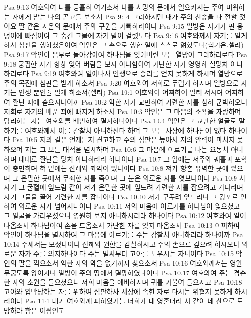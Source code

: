 Psa 9:13  여호와여 나를 긍휼히 여기소서 나를 사망의 문에서 일으키시는 주여 미워하는 자에게 받는 나의 곤고를 보소서
Psa 9:14  그리하시면 내가 주의 찬송을 다 전할 것이요 딸 같은 시온의 문에서 주의 구원을 기뻐하리이다
Psa 9:15  열방은 자기가 판 웅덩이에 빠짐이여 그 숨긴 그물에 자기 발이 걸렸도다
Psa 9:16  여호와께서 자기를 알게 하사 심판을 행하셨음이여 악인은 그 손으로 행한 일에 스스로 얽혔도다(힉가욘.셀라)
Psa 9:17  악인이 음부로 돌아감이여 하나님을 잊어버린 모든 열방이 그리하리로다
Psa 9:18  궁핍한 자가 항상 잊어 버림을 보지 아니함이여 가난한 자가 영영히 실망치 아니하리로다
Psa 9:19  여호와여 일어나사 인생으로 승리를 얻지 못하게 하시며 열방으로 주의 목전에 심판을 받게 하소서
Psa 9:20  여호와여 저희로 두렵게 하시며 열방으로 자기는 인생 뿐인줄 알게 하소서(셀라)
Psa 10:1  여호와여 어찌하여 멀리 서시며 어찌하여 환난 때에 숨으시나이까
Psa 10:2  악한 자가 교만하여 가련한 자를 심히 군박하오니 저희로 자기의 베푼 꾀에 빠지게 하소서
Psa 10:3  악인은 그 마음의 소욕을 자랑하며 탐리하는 자는 여호와를 배반하여 멸시하나이다
Psa 10:4  악인은 그 교만한 얼굴로 말하기를 여호와께서 이를 감찰치 아니하신다 하며 그 모든 사상에 하나님이 없다 하나이다
Psa 10:5  저의 길은 언제든지 견고하고 주의 심판은 높아서 저의 안력이 미치지 못하오며 저는 그 모든 대적을 멸시하며
Psa 10:6  그 마음에 이르기를 나는 요동치 아니하며 대대로 환난을 당치 아니하리라 하나이다
Psa 10:7  그 입에는 저주와 궤휼과 포학이 충만하며 혀 밑에는 잔해와 죄악이 있나이다
Psa 10:8  저가 향촌 유벽한 곳에 앉으며 그 은밀한 곳에서 무죄한 자를 죽이며 그 눈은 외로운 자를 엿보나이다
Psa 10:9  사자가 그 굴혈에 엎드림 같이 저가 은밀한 곳에 엎드려 가련한 자를 잡으려고 기다리며 자기 그물을 끌어 가련한 자를 잡나이다
Psa 10:10  저가 구푸려 엎드리니 그 강포로 인하여 외로운 자가 넘어지나이다
Psa 10:11  저의 마음에 이르기를 하나님이 잊으셨고 그 얼굴을 가리우셨으니 영원히 보지 아니하시리라 하나이다
Psa 10:12  여호와여 일어나옵소서 하나님이여 손을 드옵소서 가난한 자를 잊지 마옵소서
Psa 10:13  어찌하여 악인이 하나님을 멸시하여 그 마음에 이르기를 주는 감찰치 아니하리라 하나이까
Psa 10:14  주께서는 보셨나이다 잔해와 원한을 감찰하시고 주의 손으로 갚으려 하시오니 외로운 자가 주를 의지하나이다 주는 벌써부터 고아를 도우시는 자니이다
Psa 10:15  악인의 팔을 꺽으소서 악한 자의 악을 없기까지 찾으소서
Psa 10:16  여호와께서는 영원무궁토록 왕이시니 열방이 주의 땅에서 멸망하였나이다
Psa 10:17  여호와여 주는 겸손한 자의 소원을 들으셨으니 저희 마음을 예비하시며 귀를 기울여 들으시고
Psa 10:18  고아와 압박당하는 자를 위하여 심판하사 세상에 속한 자로 다시는 위협지 못하게 하시리이다
Psa 11:1  내가 여호와께 피하였거늘 너희가 내 영혼더러 새 같이 네 산으로 도망하라 함은 어찜인고
